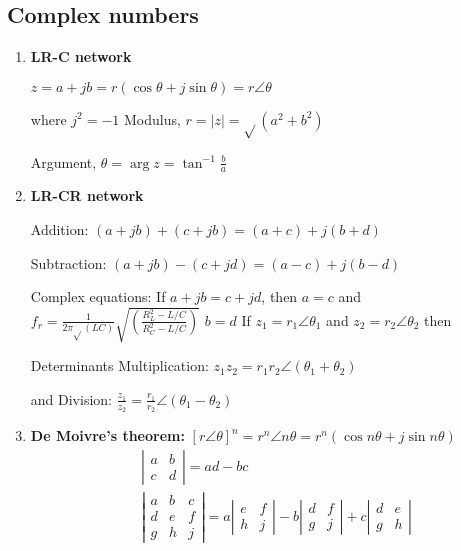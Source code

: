 \documentclass[10pt]{article}
\begin{document}
\subsection{Complex numbers}
\begin{enumerate}

\item \textbf{LR-C network}

$z=a+j b=r(\cos \theta+j \sin \theta)=r \angle \theta$

where $j^2=-1$ Modulus, $r=|z|=\sqrt{ }\left(a^2+b^2\right)$

Argument, $\theta=\arg z=\tan ^{-1} \frac{b}{a}$\\


\item\textbf{LR-CR network}


Addition: $(a+j b)+(c+j b)=(a+c)+j(b+d)$

Subtraction: $(a+j b)-(c+j d)=(a-c)+j(b-d)$

Complex equations: If $a+j b=c+j d$, then $a=c$ and
$f_r=\frac{1}{2 \pi \sqrt{ }(L C)} \sqrt{\left(\frac{R_L^2-L / C}{R_C^2-L / C}\right)}$
$b=d$
If $z_1=r_1 \angle \theta_1$ and $z_2=r_2 \angle \theta_2$ then


Determinants
Multiplication: $z_1 z_2=r_1 r_2 \angle\left(\theta_1+\theta_2\right)$

and Division: $\frac{z_1}{z_2}=\frac{r_1}{r_2} \angle\left(\theta_1-\theta_2\right)$\\

\item\textbf{De Moivre's theorem:}
$[r \angle \theta]^n=r^n \angle n \theta=r^n(\cos n \theta+j \sin n \theta)$
$$
\begin{aligned}
&\left|\begin{array}{ll}
a & b \\
c & d
\end{array}\right|=a d-b c \\
&\left|\begin{array}{lll}
a & b & c \\
d & e & f \\
g & h & j
\end{array}\right|=a\left|\begin{array}{ll}
e & f \\
h & j
\end{array}\right|-b\left|\begin{array}{ll}
d & f \\
g & j
\end{array}\right|+c\left|\begin{array}{ll}
d & e \\
g & h
\end{array}\right|
\end{aligned}
$$
\end{enumerate}
\end{document}
